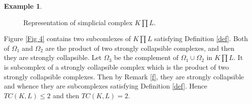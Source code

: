 \documentclass[preprint,11pt %
]{hjm1}
\theoremstyle{definition}
\newtheorem{example}[theorem]{Example}
\begin{document}
\begin{example}
\begin{figure}[!ht]
\centering
{}
\caption{Representation of simplicial complex $K \prod L$.}\label{Fig 3}
\end{figure}



Figure \ref{Fig 4} contains  two subcomlexes of $K \prod L$  satisfying Definition \ref{def}. Both of  $\Omega _1 $ and $\Omega _2 $ are the product of two strongly collapsible complexes, and then they are strongly collapsible. Let  $\Omega _3$ be the complement of $\Omega_1 \cup \Omega_2$ in $K \prod L$. It is subcomplex of a strongly collapsible complex which is the product of two strongly collapsible complexes. Then by Remark \ref{f}, they are strongly collapsible and whence they are subcomplexes satisfying Definition \ref{def}. Hence $TC(K,L)\leq 2$ and then $TC(K,L)=2$.
 

\end{example}
\end{document}
